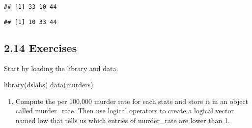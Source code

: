 \documentclass[
]{article}
\newenvironment{Shaded}{\begin{snugshade}}{\end{snugshade}}
\newcommand{\DecValTok}[1]{\textcolor[rgb]{0.00,0.00,0.81}{#1}}
\newcommand{\FunctionTok}[1]{\textcolor[rgb]{0.00,0.00,0.00}{#1}}
\newcommand{\NormalTok}[1]{#1}
\newcommand{\OtherTok}[1]{\textcolor[rgb]{0.56,0.35,0.01}{#1}}
\newcommand{\SpecialCharTok}[1]{\textcolor[rgb]{0.00,0.00,0.00}{#1}}
\newcommand{\StringTok}[1]{\textcolor[rgb]{0.31,0.60,0.02}{#1}}
\providecommand{\tightlist}{%
  \setlength{\itemsep}{0pt}\setlength{\parskip}{0pt}}
\begin{document}
\begin{verbatim}
## [1] 33 10 44
\end{verbatim}

\begin{Shaded}
\end{Shaded}

\begin{verbatim}
## [1] 10 33 44
\end{verbatim}

\hypertarget{exercises-5}{%
\subsection{2.14 Exercises}\label{exercises-5}}

Start by loading the library and data.

\begin{Shaded}
\begin{Highlighting}[]
\FunctionTok{library}\NormalTok{(dslabs)}
\FunctionTok{data}\NormalTok{(murders)}
\end{Highlighting}
\end{Shaded}

\begin{enumerate}
\def\labelenumi{\arabic{enumi}.}
\tightlist
\item
  Compute the per 100,000 murder rate for each state and store it in an
  object called murder\_rate. Then use logical operators to create a
  logical vector named low that tells us which entries of murder\_rate
  are lower than 1.
\end{enumerate}

\begin{Shaded}
\end{Shaded}
\end{document}
